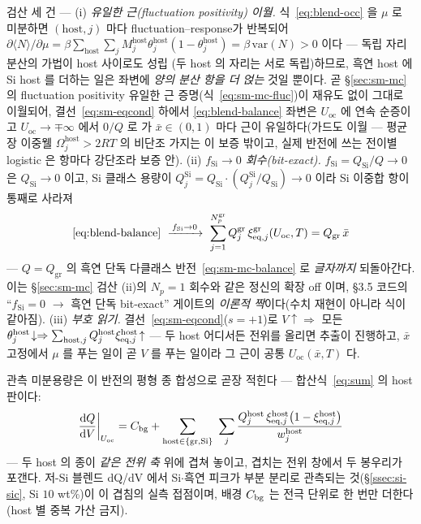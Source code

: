 \begin{verifybox}
검산 세 건 --- (i) \emph{유일한 근(fluctuation positivity) 이월.} 식~\eqref{eq:blend-occ} 을 $\mu$ 로 미분하면
$(\mathrm{host},j)$ 마다 fluctuation--response가 반복되어
$\partial\langle N\rangle/\partial\mu=\beta\sum_\mathrm{host}\sum_jM_j^\mathrm{host}\theta_j^\mathrm{host}
(1-\theta_j^\mathrm{host})=\beta\,\mathrm{var}(N)>0$ 이다 --- 독립 자리 분산의 가법이 host 사이로도 성립
(두 host 의 자리는 서로 독립)하므로, 흑연 host 에 Si host 를 더하는 일은 좌변에 \emph{양의 분산 항을 더
얹는} 것일 뿐이다. 곧 \S\ref{sec:sm-mc} 의 fluctuation positivity 유일한 근 증명(식~\eqref{eq:sm-mc-fluc})이 재유도
없이 그대로 이월되어, 결선~\eqref{eq:sm-eqcond} 하에서 \eqref{eq:blend-balance} 좌변은 $U_\mathrm{oc}$
에 연속 순증이고 $U_\mathrm{oc}\to\mp\infty$ 에서 $0/Q$ 로 가 $\bar x\in(0,1)$ 마다 근이 유일하다(가드도
이월 --- 평균장 이중웰 $\Omega_j^\mathrm{host}>2RT$ 의 비단조 가지는 이 보증 밖이고, 실제 반전에 쓰는
전이별 logistic 은 항마다 강단조라 보증 안). (ii) \emph{$f_\mathrm{Si}\to0$ 회수(bit-exact).}
$f_\mathrm{Si}=Q_\mathrm{Si}/Q\to0$ 은 $Q_\mathrm{Si}\to0$ 이고, Si 클래스 용량이
$Q_j^\mathrm{Si}=Q_\mathrm{Si}\cdot(Q_j^\mathrm{Si}/Q_\mathrm{Si})\to0$ 이라 Si 이중합 항이 통째로 사라져
\begin{equation}
\eqref{eq:blend-balance}\ \xrightarrow{\,f_\mathrm{Si}\to0\,}\
\sum_{j=1}^{N_p^\mathrm{gr}}Q_j^\mathrm{gr}\,\xi_{\eq,j}^\mathrm{gr}(U_\mathrm{oc},T)=Q_\mathrm{gr}\,\bar x
\label{eq:blend-limit}
\end{equation}
--- $Q=Q_\mathrm{gr}$ 의 흑연 단독 다클래스 반전~\eqref{eq:sm-mc-balance} 로 \emph{글자까지} 되돌아간다.
이는 \S\ref{sec:sm-mc} 검산 (ii)의 $N_p{=}1$ 회수와 같은 정신의 확장 off 이며, §3.5 코드의
``$f_\mathrm{Si}{=}0$ $\to$ 흑연 단독 bit-exact'' 게이트의 \emph{이론적 짝}이다(수치 재현이 아니라 식이
같아짐). (iii) \emph{부호 읽기.} 결선~\eqref{eq:sm-eqcond}($s{=}+1$)로 $V\!\uparrow\Rightarrow$ 모든
$\theta_j^\mathrm{host}\!\downarrow\Rightarrow\sum_{\mathrm{host},j}Q_j^\mathrm{host}
\xi_{\mathrm{eq},j}^\mathrm{host}\!\uparrow$ --- 두 host 어디서든 전위를 올리면 추출이 진행하고, $\bar x$ 고정에서
$\mu$ 를 푸는 일이 곧 $V$ 를 푸는 일이라 그 근이 공통 $U_\mathrm{oc}(\bar x,T)$ 다.
\end{verifybox}

관측 미분용량은 이 반전의 평형 종 합성으로 곧장 적힌다 --- 합산식~\eqref{eq:sum} 의 host 판이다:
\begin{equation}
\frac{\dd Q}{\dd V}\bigg|_{U_\mathrm{oc}}=C_\bg+\sum_{\mathrm{host}\in\{\mathrm{gr},\mathrm{Si}\}}\ \sum_{j}
\frac{Q_j^{\mathrm{host}}\,\xi_{\eq,j}^{\mathrm{host}}\bigl(1-\xi_{\eq,j}^{\mathrm{host}}\bigr)}{w_j^{\mathrm{host}}}
\label{eq:blend-dqdv}
\end{equation}
--- 두 host 의 종이 \emph{같은 전위 축} 위에 겹쳐 놓이고, 겹치는 전위 창에서 두 봉우리가 포갠다. 저-Si
블렌드 dQ/dV 에서 Si$\cdot$흑연 피크가 부분 분리로 관측되는 것(\S\ref{ssec:si-sic}, Si $10$
wt\%\cite{naboka_sic2021})이 이 겹침의 실측 접점이며, 배경 $C_{\mathrm{bg}}$ 는 전극 단위로 한 번만 더한다(host 별
중복 가산 금지).

